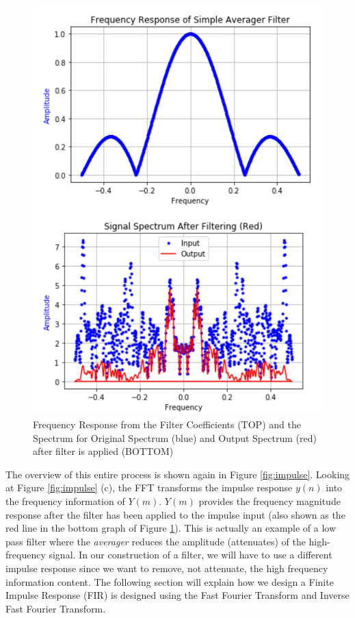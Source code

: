 \begin{figure}[h!]
	\centering
	\includegraphics[scale = .8]{example_spectrum.png} %
	\caption{Frequency Response from the Filter Coefficients (TOP) and the Spectrum for Original Spectrum (blue) and Output Spectrum (red) after filter is applied (BOTTOM)}
	\label{fig:exspec}
\end{figure}    

The overview of this entire process is shown again in Figure \ref{fig:impulse}.  Looking at Figure \ref{fig:impulse} (c), the FFT transforms the impulse response $y(n)$ into the frequency information of $Y(m)$.  $Y(m)$ provides the frequency magnitude response after the filter has been applied to the impulse input (also shown as the red line in the bottom graph of Figure \ref{fig:exspec}).  This is actually an example of a low pass filter where the \textit{averager} reduces the amplitude (attenuates) of the high-frequency  signal.  In our construction of a filter, we will have to use a different impulse response since we want to remove, not attenuate, the high frequency information content.  The following section will explain how we design a Finite Impulse Response (FIR) is designed using the Fast Fourier Transform and Inverse Fast Fourier Transform.

